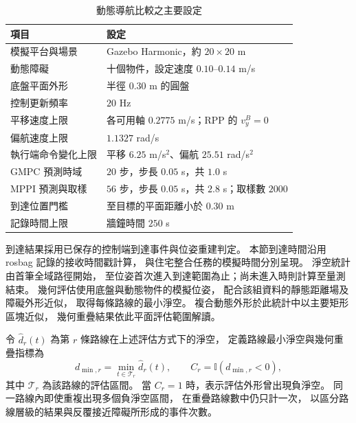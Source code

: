 \begin{table}[htbp]
    \centering
    \caption{動態導航比較之主要設定}
    \label{tab:ch4_navigation_settings}
    \begingroup
    \small
    \renewcommand{\arraystretch}{1.2}
    \begin{tabular}{p{} p{}}
        \hline
        項目 & 設定 \\
        \hline
        模擬平台與場景 & Gazebo Harmonic，約 $20\times20$ m \\
        動態障礙 & 十個物件，設定速度 $0.10$--$0.14$ m/s \\
        底盤平面外形 & 半徑 $0.30$ m 的圓盤 \\
        控制更新頻率 & $20$ Hz \\
        平移速度上限 & 各可用軸 $0.2775$ m/s；RPP 的 $v_y^B=0$ \\
        偏航速度上限 & $1.1327$ rad/s \\
        執行端命令變化上限
        & 平移 $6.25$ m/s$^2$、偏航 $25.51$ rad/s$^2$ \\
        GMPC 預測時域 & $20$ 步，步長 $0.05$ s，共 $1.0$ s \\
        MPPI 預測與取樣 & $56$ 步，步長 $0.05$ s，共 $2.8$ s；取樣數 $2000$ \\
        到達位置門檻 & 至目標的平面距離小於 $0.30$ m \\
        記錄時間上限 & 牆鐘時間 $250$ s \\
        \hline
    \end{tabular}
    \endgroup
\end{table}

到達結果採用已保存的控制端到達事件與位姿重建判定。
本節到達時間沿用 rosbag 記錄的接收時間戳計算，
與住宅整合任務的模擬時間分別呈現。
淨空統計由首筆全域路徑開始，
至位姿首次進入到達範圍為止；尚未進入時則計算至量測結束。
幾何評估使用底盤與動態物件的模擬位姿，
配合該組資料的靜態距離場及障礙外形近似，
取得每條路線的最小淨空。
複合動態外形於此統計中以主要矩形區塊近似，
幾何重疊結果依此平面評估範圍解讀。

令 $\hat d_r(t)$ 為第 $r$ 條路線在上述評估方式下的淨空，
定義路線最小淨空與幾何重疊指標為
\begin{equation}
    d_{\min,r}=\min_{t\in\mathcal T_r}\hat d_r(t),
    \qquad
    C_r=\mathbb I(d_{\min,r}<0),
    \label{eq:ch4_navigation_overlap_indicator}
\end{equation}
其中 $\mathcal T_r$ 為該路線的評估區間。
當 $C_r=1$ 時，表示評估外形曾出現負淨空。
同一路線內即使重複出現多個負淨空區間，
在重疊路線數中仍只計一次，
以區分路線層級的結果與反覆接近障礙所形成的事件次數。

